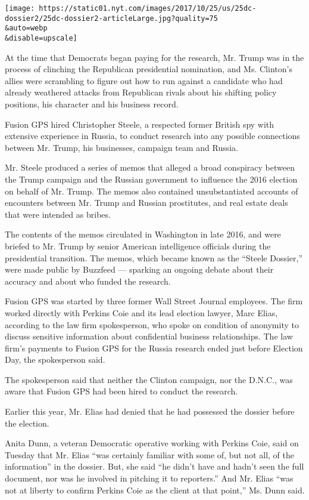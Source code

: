 \texttt{[image: https://static01.nyt.com/images/2017/10/25/us/25dc-dossier2/25dc-dossier2-articleLarge.jpg?quality=75\\\&auto=webp\\\&disable=upscale]}

At the time that Democrats began paying for the research, Mr. Trump was
in the process of clinching the Republican presidential nomination, and
Ms. Clinton's allies were scrambling to figure out how to run against a
candidate who had already weathered attacks from Republican rivals about
his shifting policy positions, his character and his business record.

Fusion GPS hired Christopher Steele, a respected former British spy with
extensive experience in Russia, to conduct research into any possible
connections between Mr. Trump, his businesses, campaign team and Russia.

Mr. Steele produced a series of memos that alleged a broad conspiracy
between the Trump campaign and the Russian government to influence the
2016 election on behalf of Mr. Trump. The memos also contained
unsubstantiated accounts of encounters between Mr. Trump and Russian
prostitutes, and real estate deals that were intended as bribes.

The contents of the memos circulated in Washington in late 2016, and
were briefed to Mr. Trump by senior American intelligence officials
during the presidential transition. The memos, which became known as the
``Steele Dossier,'' were made public by Buzzfeed --- sparking an ongoing
debate about their accuracy and about who funded the research.

Fusion GPS was started by three former Wall Street Journal employees.
The firm worked directly with Perkins Coie and its lead election lawyer,
Marc Elias, according to the law firm spokesperson, who spoke on
condition of anonymity to discuss sensitive information about
confidential business relationships. The law firm's payments to Fusion
GPS for the Russia research ended just before Election Day, the
spokesperson said.

The spokesperson said that neither the Clinton campaign, nor the D.N.C.,
was aware that Fusion GPS had been hired to conduct the research.

Earlier this year, Mr. Elias had denied that he had possessed the
dossier before the election.

Anita Dunn, a veteran Democratic operative working with Perkins Coie,
said on Tuesday that Mr. Elias ``was certainly familiar with some of,
but not all, of the information'' in the dossier. But, she said ``he
didn't have and hadn't seen the full document, nor was he involved in
pitching it to reporters.'' And Mr. Elias ``was not at liberty to
confirm Perkins Coie as the client at that point,'' Ms. Dunn said.

